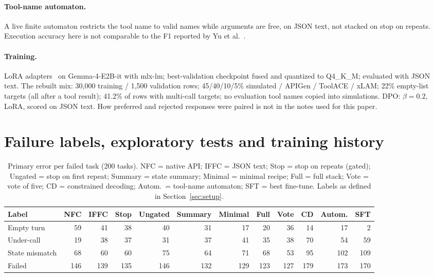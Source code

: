 \documentclass[11pt]{article}
\begin{document}
\paragraph{Tool-name automaton.} A live finite automaton restricts the tool name to valid names while arguments are free, on JSON text, not stacked on stop on repeats. Execution accuracy here is not comparable to the F1 reported by Yu et al.~\cite{yu2026ptc}.

\paragraph{Training.} LoRA adapters~\cite{hu2021lora} on Gemma-4-E2B-it with mlx-lm; best-validation checkpoint fused and quantized to Q4\_K\_M; evaluated with JSON text. The rebuilt mix: 30{,}000 training / 1{,}500 validation rows; 45/40/10/5\% simulated / APIGen / ToolACE / xLAM; 22\% empty-list targets (all after a tool result); 41.2\% of rows with multi-call targets; no evaluation tool names copied into simulations. DPO: $\beta{=}0.2$, LoRA, scored on JSON text. How preferred and rejected responses were paired is not in the notes used for this paper.

\section{Failure labels, exploratory tests and training history}
\label{app:fail}

\begin{table}[H]
\centering
\footnotesize
\setlength{\tabcolsep}{3pt}
\caption{Primary error per failed task (200 tasks). NFC = native API; IFFC = JSON text; Stop = stop on repeats (gated); Ungated = stop on first repeat; Summary = state summary; Minimal = minimal recipe; Full = full stack; Vote = vote of five; CD = constrained decoding; Autom.\ = tool-name automaton; SFT = best fine-tune. Labels as defined in Section~\ref{sec:setup}.}
\label{tab:failfull}
\begin{tabular}{@{}lrrrrrrrrrrr@{}}
\toprule
Label & NFC & IFFC & Stop & Ungated & Summary & Minimal & Full & Vote & CD & Autom. & SFT \\
\midrule
Empty turn & 59 & 41 & 38 & 40 & 31 & 17 & 20 & 36 & 14 & 17 & 2 \\
Under-call & 19 & 38 & 37 & 31 & 37 & 41 & 35 & 38 & 70 & 54 & 59 \\
State mismatch & 68 & 60 & 60 & 75 & 64 & 71 & 68 & 53 & 95 & 102 & 109 \\
\midrule
Failed & 146 & 139 & 135 & 146 & 132 & 129 & 123 & 127 & 179 & 173 & 170 \\
\bottomrule
\end{tabular}
\end{table}
\end{document}
